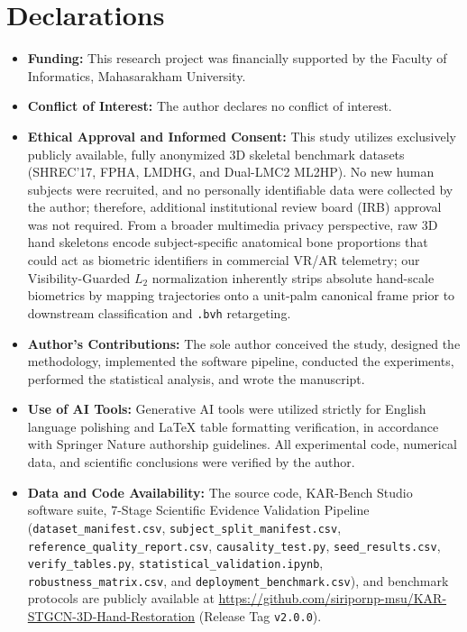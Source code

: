 \documentclass[10pt,twocolumn]{article}
\begin{document}
\section*{Declarations}
\begin{itemize}
    \item \textbf{Funding:} This research project was financially supported by the Faculty of Informatics, Mahasarakham University.
    \item \textbf{Conflict of Interest:} The author declares no conflict of interest.
    \item \textbf{Ethical Approval and Informed Consent:} This study utilizes exclusively publicly available, fully anonymized 3D skeletal benchmark datasets (SHREC'17, FPHA, LMDHG, and Dual-LMC2 ML2HP). No new human subjects were recruited, and no personally identifiable data were collected by the author; therefore, additional institutional review board (IRB) approval was not required. From a broader multimedia privacy perspective, raw 3D hand skeletons encode subject-specific anatomical bone proportions that could act as biometric identifiers in commercial VR/AR telemetry; our Visibility-Guarded $L_2$ normalization inherently strips absolute hand-scale biometrics by mapping trajectories onto a unit-palm canonical frame prior to downstream classification and \texttt{.bvh} retargeting.
    \item \textbf{Author's Contributions:} The sole author conceived the study, designed the methodology, implemented the software pipeline, conducted the experiments, performed the statistical analysis, and wrote the manuscript.
    \item \textbf{Use of AI Tools:} Generative AI tools were utilized strictly for English language polishing and LaTeX table formatting verification, in accordance with Springer Nature authorship guidelines. All experimental code, numerical data, and scientific conclusions were verified by the author.
    \item \textbf{Data and Code Availability:} The source code, KAR-Bench Studio software suite, 7-Stage Scientific Evidence Validation Pipeline (\texttt{dataset\_manifest.csv}, \texttt{subject\_split\_manifest.csv}, \texttt{reference\_quality\_report.csv}, \texttt{causality\_test.py}, \texttt{seed\_results.csv}, \texttt{verify\_tables.py}, \texttt{statistical\_validation.ipynb}, \texttt{robustness\_matrix.csv}, and \texttt{deployment\_benchmark.csv}), and benchmark protocols are publicly available at \url{https://github.com/siripornp-msu/KAR-STGCN-3D-Hand-Restoration} (Release Tag \texttt{v2.0.0}).
\end{itemize}
\end{document}
